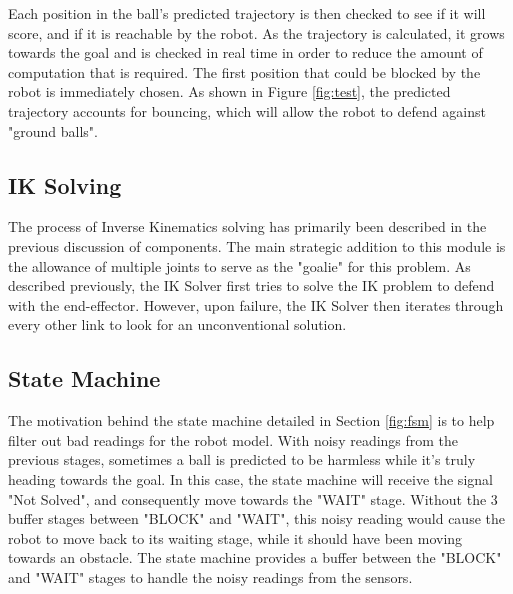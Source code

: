\documentclass{article}
\begin{document}
Each position in the ball's predicted trajectory is then checked to see if it will score, and if it is reachable by the robot. As the trajectory is calculated, it grows towards the goal and is checked in real time in order to reduce the amount of computation that is required. The first position that could be blocked by the robot is immediately chosen. As shown in Figure \ref{fig:test}, the predicted trajectory accounts for bouncing, which will allow the robot to defend against "ground balls".

\subsection{IK Solving}
The process of Inverse Kinematics solving has primarily been described in the previous discussion of components. The main strategic addition to this module is the allowance of multiple joints to serve as the "goalie" for this problem. As described previously, the IK Solver first tries to solve the IK problem to defend with the end-effector. However, upon failure, the IK Solver then iterates through every other link to look for an unconventional solution.

\subsection{State Machine}
The motivation behind the state machine detailed in Section \ref{fig:fsm} is to help filter out bad readings for the robot model. With noisy readings from the previous stages, sometimes a ball is predicted to be harmless while it's truly heading towards the goal. In this case, the state machine will receive the signal "Not Solved", and consequently move towards the "WAIT" stage. Without the 3 buffer stages between "BLOCK" and "WAIT", this noisy reading would cause the robot to move back to its waiting stage, while it should have been moving towards an obstacle. The state machine provides a buffer between the "BLOCK" and "WAIT" stages to handle the noisy readings from the sensors.

\end{document}
